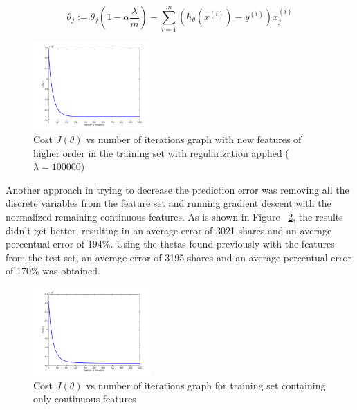 \documentclass[10pt,twocolumn,letterpaper]{article}
\begin{document}
\begin{equation}\label{eq:regularization}
\theta_{j} := \theta_{j}(1 - \alpha \dfrac{\lambda}{m}) - \sum\limits_{i=1}^m  (h_{\theta}(x^{(i)})-y^{(i)})x_{j}^{(i)}
\end{equation}

\begin{figure}[H]
\begin{center}
	\includegraphics[width=0.4\textwidth]{pics/power_12_with_reg_100k}
	\caption{Cost $J(\theta)$ vs number of iterations graph with new features of higher order in the training set with regularization applied ($\lambda = 100000$)\label{fig:power_12_with_reg}}
\end{center} 
\end{figure}   

Another approach in trying to decrease the prediction error was removing all the discrete variables from the feature set and running gradient descent with the normalized remaining continuous features. As is shown in Figure ~\ref{fig:third_run_label}, the results didn't get better, resulting in an average error of 3021 shares and an average percentual error of 194$\%$. Using the thetas found previously with the features from the test set, an average error of 3195 shares and an average percentual error of 170$\%$ was obtained.

\begin{figure}[H]
\begin{center}
	\includegraphics[width=0.4\textwidth]{pics/third_run_001_1000}
	\caption{Cost $J(\theta)$ vs number of iterations graph for training set containing only continuous features\label{fig:third_run_label}}
\end{center} 
\end{figure}   
\end{document}
